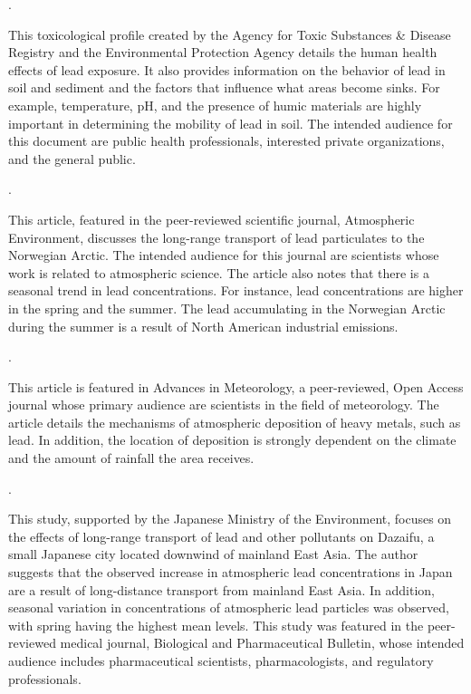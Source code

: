 \documentclass{article}
\begin{document}
\noindent {}.
\medskip

This toxicological profile created by the Agency for Toxic Substances \& Disease Registry and the Environmental Protection Agency details the human health effects of lead exposure. It also provides information on the behavior of lead in soil and sediment and the factors that influence what areas become sinks. For example, temperature, pH, and the presence of humic materials are highly important in determining the mobility of lead in soil. The intended audience for this document are public health professionals, interested private organizations, and the general public. 

\medskip

\noindent {}.

\medskip

This article, featured in the peer-reviewed scientific journal, Atmospheric Environment, discusses the long-range transport of lead particulates to the Norwegian Arctic. The intended audience for this journal are scientists whose work is related to atmospheric science. The article also notes that there is a seasonal trend in lead concentrations. For instance, lead concentrations are higher in the spring and the summer. The lead accumulating in the Norwegian Arctic during the summer is a result of North American industrial emissions. 
\medskip

\noindent {}.

\medskip

This article is featured in Advances in Meteorology, a peer-reviewed, Open Access journal whose primary audience are scientists in the field of meteorology. The article details the mechanisms of atmospheric deposition of heavy metals, such as lead. In addition, the location of deposition is strongly dependent on the climate and the amount of rainfall the area receives. 

\medskip

\noindent {}.

\medskip

This study, supported by the Japanese Ministry of the Environment, focuses on the effects of long-range transport of lead and other pollutants on Dazaifu, a small Japanese city located downwind of mainland East Asia. The author suggests that the observed increase in atmospheric lead concentrations in Japan are a result of long-distance transport from mainland East Asia. In addition, seasonal variation in concentrations of atmospheric lead particles was observed, with spring having the highest mean levels. This study was featured in the peer-reviewed medical journal, Biological and Pharmaceutical Bulletin, whose intended audience includes pharmaceutical scientists, pharmacologists, and regulatory professionals. 
\end{document}
